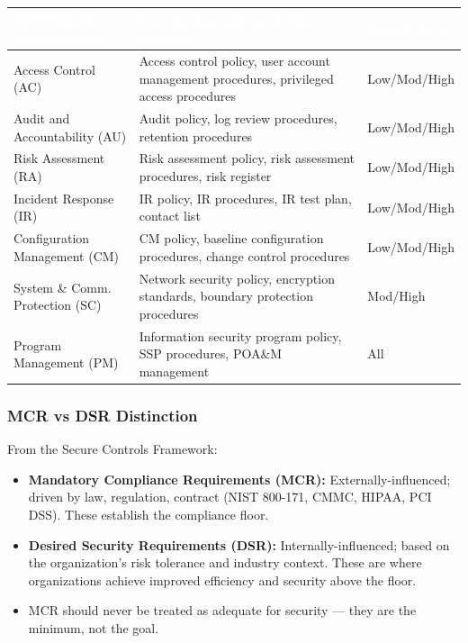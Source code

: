 \documentclass[11pt,letterpaper]{article}
\newcommand{\tableheader}[1]{\textbf{\sffamily\textcolor{white}{#1}}}
\begin{document}
\begin{center}
\begin{tabularx}{\textwidth}{L{3.5cm}XL{2.5cm}}
\toprule
{}
\tableheader{NIST 800-53 Control Family} & \tableheader{Key Documentation Artifacts Required} & \tableheader{Impact Level} \\
\midrule
Access Control (AC) & Access control policy, user account management procedures, privileged access procedures & Low/Mod/High \\
Audit and Accountability (AU) & Audit policy, log review procedures, retention procedures & Low/Mod/High \\
Risk Assessment (RA) & Risk assessment policy, risk assessment procedures, risk register & Low/Mod/High \\
Incident Response (IR) & IR policy, IR procedures, IR test plan, contact list & Low/Mod/High \\
Configuration Management (CM) & CM policy, baseline configuration procedures, change control procedures & Low/Mod/High \\
System \& Comm. Protection (SC) & Network security policy, encryption standards, boundary protection procedures & Mod/High \\
Program Management (PM) & Information security program policy, SSP procedures, POA\&M management & All \\
\bottomrule
\end{tabularx}
\end{center}

\subsubsection{MCR vs DSR Distinction}

From the Secure Controls Framework:
\begin{itemize}[leftmargin=*]
  \item \textbf{Mandatory Compliance Requirements (MCR):} Externally-influenced; driven by law, regulation, contract (NIST 800-171, CMMC, HIPAA, PCI DSS). These establish the compliance floor.
  \item \textbf{Desired Security Requirements (DSR):} Internally-influenced; based on the organization's risk tolerance and industry context. These are where organizations achieve improved efficiency and security above the floor.
  \item MCR should never be treated as adequate for security --- they are the minimum, not the goal.
\end{itemize}
\end{document}
